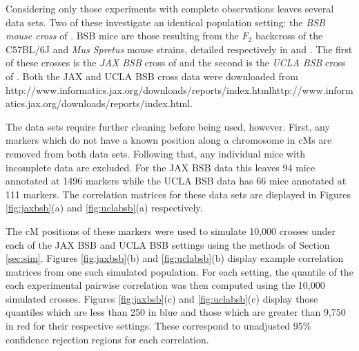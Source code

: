 \documentclass{article}
\newcommand{\href}[1]{#1} %
\begin{document}
Considering only those experiments with complete observations leaves several data sets. Two of these investigate an identical population setting: the \emph{BSB mouse cross} of \cite{fisleretal1993bsb}. BSB mice are those resulting from the $F_2$ backcross of the C57BL/6J and {\it Mus Spretus} mouse strains, detailed respectively in \cite{C57BL6J} and \cite{dejageretal2009mspretus}. The first of these crosses is the \emph{JAX BSB} cross of \cite{roweetal1994jaxbsb} and the second is the \emph{UCLA BSB} cross of \cite{welchetal1996uclabsb}. Both the JAX and UCLA BSB cross data were downloaded from \href{http://www.informatics.jax.org/downloads/reports/index.html}{http://www.informatics.jax.org/downloads/reports/index.html}.

The data sets require further cleaning before being used, however. First, any markers which do not have a known position along a chromosome in cMs are removed from both data sets. Following that, any individual mice with incomplete data are excluded. For the JAX BSB data this leaves 94 mice annotated at 1496 markers while the UCLA BSB data has 66 mice annotated at 111 markers. The correlation matrices for these data sets are displayed in Figures \ref{fig:jaxbsb}(a) and \ref{fig:uclabsb}(a) respectively.

The cM positions of these markers were used to simulate 10,000 crosses under each of the JAX BSB and UCLA BSB settings using the methods of Section \ref{sec:sim}. Figures \ref{fig:jaxbsb}(b) and \ref{fig:uclabsb}(b) display example correlation matrices from one such simulated population. For each setting, the quantile of the each experimental pairwise correlation was then computed using the 10,000 simulated crosses. Figures \ref{fig:jaxbsb}(c) and \ref{fig:uclabsb}(c) display those quantiles which are less than 250 in blue and those which are greater than 9,750 in red for their respective settings. These correspond to unadjusted 95\% confidence rejection regions for each correlation.
\end{document}
